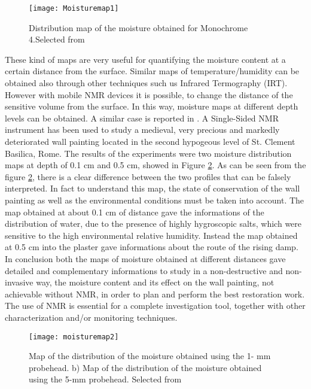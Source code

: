 \documentclass[a4paper,11pt]{report}
\begin{document}
\begin{figure}[h]
	\centering
	\texttt{[image: Moisturemap1]}
	\caption{Distribution map of the moisture obtained for Monochrome 4.Selected from \cite{trefresco} }\label{moisturemap1}
\end{figure}
These kind of maps are very useful for quantifying the moisture content at a certain distance from the surface. Similar maps of temperature/humidity can be obtained also through other techniques such us Infrared Termography (IRT). However with mobile NMR devices it is possible, to change the distance of the sensitive volume from the surface. In this way, moisture maps at different depth levels can be obtained. A similar case is reported in \cite{quattrofresco}. A Single-Sided NMR instrument has been used to  study a medieval, very precious and markedly deteriorated wall painting located in the second hypogeous level of St. Clement Basilica, Rome. The results of the experiments were two moisture distribution maps at depth of 0.1 cm and 0.5 cm, showed in Figure \ref{moisturemap2}. As can be seen from the figure \ref{moisturemap2}, there is a clear difference between the two profiles that can be falsely interpreted. In fact to understand this map, the state of conservation of the wall painting as well as the environmental conditions must be taken into account. The map obtained at about 0.1 cm of distance gave the informations of the distribution of water, due to the presence of highly hygroscopic salts, which were sensitive to the high environmental relative humidity. Instead the map obtained at 0.5 cm into the plaster gave informations about the route of the rising damp.
   In conclusion both the maps of moisture obtained at different distances gave detailed and complementary informations to study in a non-destructive and non-invasive way, the moisture content and its effect on the wall painting, not achievable without NMR, in order to  plan and perform the best restoration work. The use of NMR is essential for a complete investigation tool, together with other characterization and/or monitoring techniques.


\begin{figure}[h]
	\centering
	\texttt{[image: moisturemap2]}
	\caption{Map of the distribution of the moisture obtained using the 1- mm probehead. b) Map of the distribution of the moisture obtained using the 5-mm probehead. 
Selected from \cite{quattrofresco}} \label{moisturemap2}
\end{figure}
 
\end{document}
